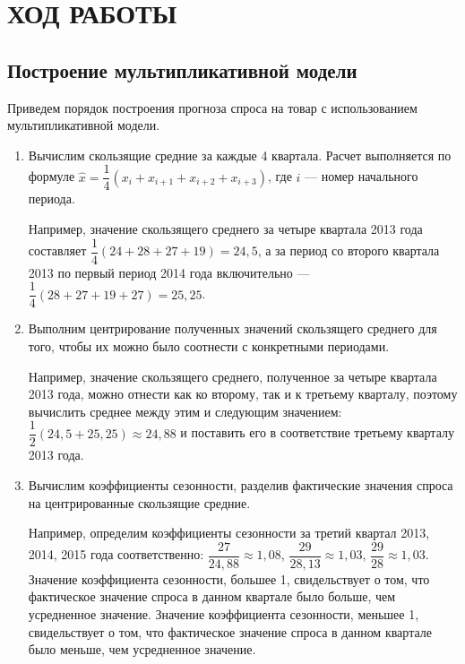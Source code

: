 \section{ХОД РАБОТЫ}

\subsection{Построение мультипликативной модели}

Приведем порядок построения прогноза спроса на товар с использованием
мультипликативной модели.

\begin{enumerate}
\item Вычислим скользящие средние за каждые 4 квартала.
  Расчет выполняется по формуле
  \( \hat{x} = \dfrac{1}{4} (x_{i} + x_{i+1} + x_{i+2} + x_{i+3}) \),
  где \( i \) --- номер начального периода.

  Например, значение скользящего среднего за четыре квартала
  2013 года составляет \( \dfrac{1}{4} (24 + 28 + 27 + 19) = 24{,}5 \),
  а за период со второго квартала 2013 по первый период 2014 года
  включительно --- \( \dfrac{1}{4} (28 + 27 + 19 + 27) = 25{,}25 \).

\item Выполним центрирование полученных значений скользящего среднего
  для того, чтобы их можно было соотнести с конкретными периодами.

  Например, значение скользящего среднего, полученное за четыре квартала
  2013 года, можно отнести как ко второму, так и к третьему кварталу,
  поэтому вычислить среднее между этим и следующим значением:
  \( \dfrac{1}{2} (24{,}5 + 25{,}25) \approx 24{,}88 \) и поставить его
  в соответствие третьему кварталу 2013 года.

\item Вычислим коэффициенты сезонности,
  разделив фактические значения спроса на центрированные скользящие средние.

  Например, определим коэффициенты сезонности за третий квартал
  2013, 2014, 2015 года соответственно:
  \( \dfrac{27}{24{,}88} \approx 1{,}08 \),
  \( \dfrac{29}{28{,}13} \approx 1{,}03 \),
  \( \dfrac{29}{28} \approx 1{,}03 \).
  Значение коэффициента сезонности, большее 1, свидельствует о том, что
  фактическое значение спроса в данном квартале было больше,
  чем усредненное значение.
  Значение коэффициента сезонности, меньшее 1, свидельствует о том, что
  фактическое значение спроса в данном квартале было меньше,
  чем усредненное значение.


\end{enumerate}
